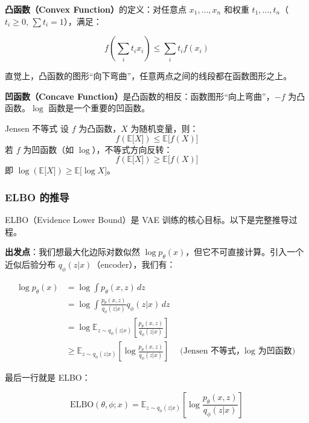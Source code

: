 \textbf{凸函数（Convex Function）}的定义：对任意点 $x_1, \ldots, x_n$ 和权重 $t_1, \ldots, t_n$（$t_i \geq 0$, $\sum t_i = 1$），满足：

$$f\left(\sum_i t_i x_i\right) \leq \sum_i t_i f(x_i)$$

直觉上，凸函数的图形``向下弯曲''，任意两点之间的线段都在函数图形之上。

\textbf{凹函数（Concave Function）}是凸函数的相反：函数图形``向上弯曲''，$-f$ 为凸函数。$\log$ 函数是一个重要的凹函数。

\begin{importantbox}{Jensen 不等式}
设 $f$ 为凸函数，$X$ 为随机变量，则：
$$f(\mathbb{E}{[}X{]}) \leq \mathbb{E}{[}f(X){]}$$
若 $f$ 为凹函数（如 $\log$），不等式方向反转：
$$f(\mathbb{E}{[}X{]}) \geq \mathbb{E}{[}f(X){]}$$
即 $\log(\mathbb{E}{[}X{]}) \geq \mathbb{E}{[}\log X{]}$。
\end{importantbox}

\subsubsection{ELBO 的推导}

ELBO（Evidence Lower Bound）是 VAE 训练的核心目标。以下是完整推导过程。

\textbf{出发点}：我们想最大化边际对数似然 $\log p_\theta(x)$，但它不可直接计算。引入一个近似后验分布 $q_\phi(z|x)$（encoder），我们有：

\begin{align}
\log p_\theta(x) &= \log \int p_\theta(x, z) \, dz \nonumber \\
&= \log \int \frac{p_\theta(x, z)}{q_\phi(z|x)} q_\phi(z|x) \, dz \nonumber \\
&= \log \mathbb{E}_{z \sim q_\phi(z|x)} \left[\frac{p_\theta(x, z)}{q_\phi(z|x)}\right] \nonumber \\
&\geq \mathbb{E}_{z \sim q_\phi(z|x)} \left[\log \frac{p_\theta(x, z)}{q_\phi(z|x)}\right] \quad \text{(Jensen 不等式，$\log$ 为凹函数)}
\end{align}

最后一行就是 ELBO：

$$\text{ELBO}(\theta, \phi; x) = \mathbb{E}_{z \sim q_\phi(z|x)} \left[\log \frac{p_\theta(x, z)}{q_\phi(z|x)}\right]$$

